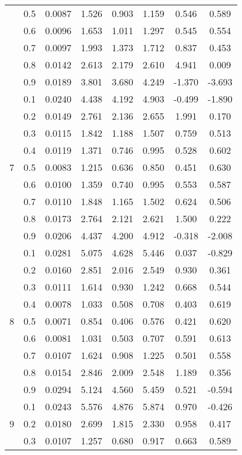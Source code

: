 \documentclass[11pt,a4paper]{report}
\begin{document}
\begin{longtable}{ | c | c || c | c | c | c | c | c | }
 & 0.5 & 0.0087 & 1.526 & 0.903 & 1.159 & 0.546 & 0.589 \\
 & 0.6 & 0.0096 & 1.653 & 1.011 & 1.297 & 0.545 & 0.554 \\
 & 0.7 & 0.0097 & 1.993 & 1.373 & 1.712 & 0.837 & 0.453 \\
 & 0.8 & 0.0142 & 2.613 & 2.179 & 2.610 & 4.941 & 0.009 \\
 & 0.9 & 0.0189 & 3.801 & 3.680 & 4.249 & -1.370 & -3.693 \\
 \hline
\multirow{9}{*}{7} & 0.1 & 0.0240 & 4.438 & 4.192 & 4.903 & -0.499 & -1.890 \\
 & 0.2 & 0.0149 & 2.761 & 2.136 & 2.655 & 1.991 & 0.170 \\
 & 0.3 & 0.0115 & 1.842 & 1.188 & 1.507 & 0.759 & 0.513 \\
 & 0.4 & 0.0119 & 1.371 & 0.746 & 0.995 & 0.528 & 0.602 \\
 & 0.5 & 0.0083 & 1.215 & 0.636 & 0.850 & 0.451 & 0.630 \\
 & 0.6 & 0.0100 & 1.359 & 0.740 & 0.995 & 0.553 & 0.587 \\
 & 0.7 & 0.0110 & 1.848 & 1.165 & 1.502 & 0.624 & 0.506 \\
 & 0.8 & 0.0173 & 2.764 & 2.121 & 2.621 & 1.500 & 0.222 \\
 & 0.9 & 0.0206 & 4.437 & 4.200 & 4.912 & -0.318 & -2.008 \\
 \hline
\multirow{9}{*}{8} & 0.1 & 0.0281 & 5.075 & 4.628 & 5.446 & 0.037 & -0.829 \\
 & 0.2 & 0.0160 & 2.851 & 2.016 & 2.549 & 0.930 & 0.361 \\
 & 0.3 & 0.0111 & 1.614 & 0.930 & 1.242 & 0.668 & 0.544 \\
 & 0.4 & 0.0078 & 1.033 & 0.508 & 0.708 & 0.403 & 0.619 \\
 & 0.5 & 0.0071 & 0.854 & 0.406 & 0.576 & 0.421 & 0.620 \\
 & 0.6 & 0.0081 & 1.031 & 0.503 & 0.707 & 0.591 & 0.613 \\
 & 0.7 & 0.0107 & 1.624 & 0.908 & 1.225 & 0.501 & 0.558 \\
 & 0.8 & 0.0154 & 2.846 & 2.009 & 2.548 & 1.189 & 0.356 \\
 & 0.9 & 0.0294 & 5.124 & 4.560 & 5.459 & 0.521 & -0.594 \\
 \hline
\multirow{9}{*}{9} & 0.1 & 0.0243 & 5.576 & 4.876 & 5.874 & 0.970 & -0.426 \\
 & 0.2 & 0.0180 & 2.699 & 1.815 & 2.330 & 0.958 & 0.417 \\
 & 0.3 & 0.0107 & 1.257 & 0.680 & 0.917 & 0.663 & 0.589 \\

\end{longtable}
\end{document}
